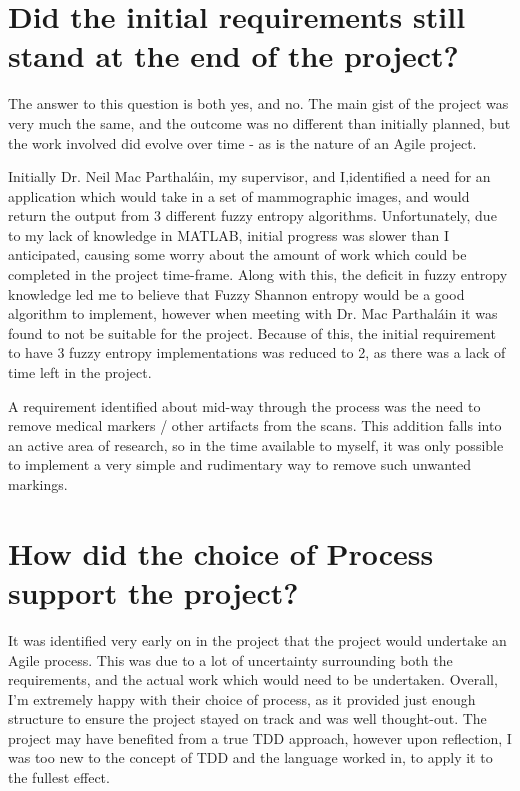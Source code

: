 \section{Did the initial requirements still stand at the end of the project?}

The answer to this question is both yes, and no. The main gist of the project was very much the same, and the outcome was no different than initially planned, but the work involved did evolve over time - as is the nature of an Agile project.

Initially Dr. Neil Mac Parthal\'ain, my supervisor, and I,identified a need for an application which would take in a set of mammographic images, and would return the output from 3 different fuzzy entropy algorithms. Unfortunately, due to my lack of knowledge in MATLAB, initial progress was slower than I anticipated, causing some worry about the amount of work which could be completed in the project time-frame. Along with this, the deficit in fuzzy entropy knowledge led me to believe that Fuzzy Shannon entropy would be a good algorithm to implement, however when meeting with Dr. Mac Parthal\'ain it was found to not be suitable for the project. Because of this, the initial requirement to have 3 fuzzy entropy implementations was reduced to 2, as there was a lack of time left in the project.

A requirement identified about mid-way through the process was the need to remove medical markers / other artifacts from the scans. This addition falls into an active area of research, so in the time available to myself, it was only possible to implement a very simple and rudimentary way to remove such unwanted markings.

\section{How did the choice of Process support the project?}

It was identified very early on in the project that the project would undertake an Agile process. This was due to a lot of uncertainty surrounding both the requirements, and the actual work which would need to be undertaken. Overall, I'm extremely happy with their choice of process, as it provided just enough structure to ensure the project stayed on track and was well thought-out. The project may have benefited from a true \acrshort{TDD} approach, however upon reflection, I was too new to the concept of \acrshort{TDD} and the language worked in, to apply it to the fullest effect.

